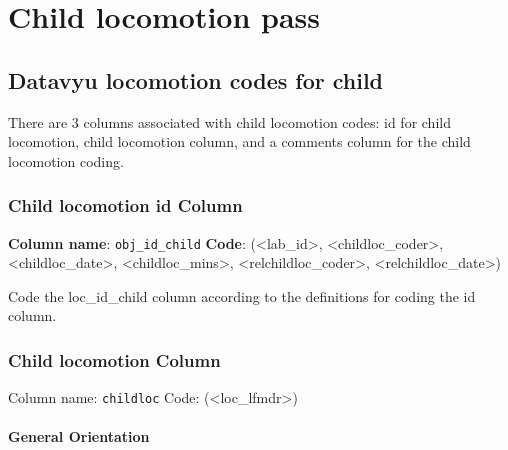 \documentclass[
  12pt,
]{book}
\begin{document}
\hypertarget{child-locomotion-pass}{%
\section{Child locomotion pass}\label{child-locomotion-pass}}

\hypertarget{datavyu-locomotion-codes-for-child}{%
\subsection*{Datavyu locomotion codes for child}\label{datavyu-locomotion-codes-for-child}}

There are 3 columns associated with child locomotion codes: id for child locomotion, child locomotion column, and a comments column for the child locomotion coding.

\hypertarget{child-locomotion-id-column}{%
\subsubsection*{Child locomotion id Column}\label{child-locomotion-id-column}}

\textbf{Column name}: \texttt{obj\_id\_child}
\textbf{Code}: (\textless lab\_id\textgreater, \textless childloc\_coder\textgreater, \textless childloc\_date\textgreater, \textless childloc\_mins\textgreater, \textless relchildloc\_coder\textgreater, \textless relchildloc\_date\textgreater)

Code the loc\_id\_child column according to the definitions for coding the id column.

\hypertarget{child-locomotion-column}{%
\subsubsection*{Child locomotion Column}\label{child-locomotion-column}}

Column name: \texttt{childloc}
Code: (\textless loc\_lfmdr\textgreater)

\hypertarget{general-orientation-3}{%
\paragraph*{General Orientation}\label{general-orientation-3}}
\end{document}
